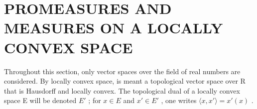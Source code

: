 \section{PROMEASURES AND MEASURES ON A LOCALLY CONVEX SPACE}

Throughout this section, only vector spaces over the field of real numbers are considered. By locally convex space, is meant a topological vector space over R that is Hausdorff and locally convex. The topological dual of a locally convex space E will be denoted \(E'\) ; for \(x \in E\) and \(x' \in E'\) , one writes \(\langle x, x' \rangle = x'(x)\) .

